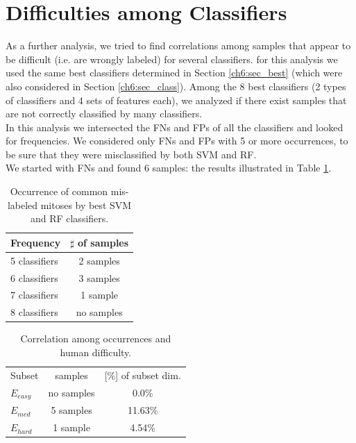 \vspace{0.5cm}

\section{Difficulties among Classifiers}

As a further analysis, we tried to find correlations among samples that appear to be difficult (i.e. are wrongly labeled) for several classifiers.
for this analysis we used the same best classifiers determined in Section \ref{ch6:sec_best} (which were also considered in Section \ref{ch6:sec_class}).
Among the 8 best classifiers (2 types of classifiers and 4 sets of features each), we analyzed if there exist samples that are not correctly classified by 
many classifiers.\\
In this analysis we intersected the \Glspl{FN} and \Glspl{FP} of all the classifiers and looked for frequencies. We considered only \Glspl{FN} and \Glspl{FP}
with 5 or more occurrences, to be sure that they were misclassified by both \Gls{SVM} and \Gls{RF}.\\
We started with \Glspl{FN} and found 6 samples: the results illustrated in Table \ref{ch6:tab20}.

\begin{table}[!hbt]
 \small
 \centering
 \begin{tabular}{lc}
    \toprule
    Frequency        & $\sharp$ of samples \\
    \midrule
     5 classifiers   & 2 samples        \\
     6 classifiers   & 3 samples         \\ 
     7 classifiers   & 1 sample         \\
     8 classifiers  &  no samples \\
     \bottomrule
 \end{tabular}
 \caption{Occurrence of common mis-labeled mitoses by best SVM and RF classifiers.}
 \label{ch6:tab20}
\end{table}

\begin{table}[!hbt]
 \small
 \centering
 \begin{tabular}{lcc}
    \toprule
    Subset        & samples & [\%] of subset dim.  \\
    \cmidrule(lr){1-3}
     $E_{easy}$   & no samples & 0.0\%  \\
     $E_{med}$    & 5 samples  & 11.63\% \\ 
     $E_{hard}$   & 1 sample   & 4.54\% \\
     \bottomrule
 \end{tabular}
 \caption{Correlation among occurrences and human difficulty.}
 \label{ch6:tab21}
\end{table}

